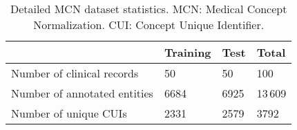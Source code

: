 \begingroup

\begin{table}[!t]

\caption[Detailed MCN dataset statistics.]{Detailed MCN dataset statistics. MCN: Medical Concept Normalization. CUI: Concept Unique Identifier.}
\label{tab:mcn-dataset}

\centering

\begin{tabular}{D{5.2cm}G{1.6cm}G{1.4cm}G{1.4cm}}

\toprule

& Training & Test & Total\\

\midrule

Number of clinical records   &   50 &   50 &     100\\
Number of annotated entities & 6684 & 6925 & 13\,609\\
Number of unique CUIs        & 2331 & 2579 &    3792\\

\bottomrule

\end{tabular}
\end{table}
\endgroup

